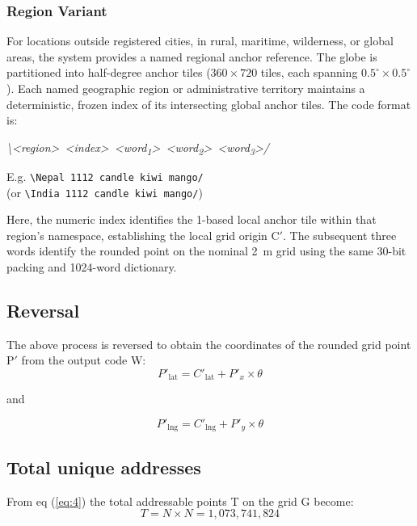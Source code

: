 \documentclass[conference]{IEEEtran}
\begin{document}
\subsubsection{Region Variant}
For locations outside registered cities, in rural, maritime, wilderness, or global areas, the system provides a named regional anchor reference. The globe is partitioned into half-degree anchor tiles ($360 \times 720$ tiles, each spanning $0.5^\circ \times 0.5^\circ$). Each named geographic region or administrative territory maintains a deterministic, frozen index of its intersecting global anchor tiles.
The code format is:
\begin{center}
\textit{\textbackslash{}\hspace{0.55em}\textless region\textgreater\ \textless index\textgreater\ \textless word\textsubscript{1}\textgreater\ \textless word\textsubscript{2}\textgreater\ \textless word\textsubscript{3}\textgreater\hspace{0.55em}/}
\end{center}
E.g. \texttt{\textbackslash{}\hspace{0.55em}Nepal 1112 candle kiwi mango\hspace{0.55em}/}\\
(or \texttt{\textbackslash{}\hspace{0.55em}India 1112 candle kiwi mango\hspace{0.55em}/})

Here, the numeric index identifies the 1-based local anchor tile within that region's namespace, establishing the local grid origin C$'$. The subsequent three words identify the rounded point on the nominal 2~m grid using the same 30-bit packing and 1024-word dictionary.

\subsection{Reversal}\label{AA}
The above process is reversed to obtain the coordinates of the rounded grid point P$'$ from the output code W:
\begin{equation}
P'_{\mathrm{lat}} = C'_{\mathrm{lat}} + P'_x \times \theta
\end{equation}

and

\begin{equation}
P'_{\mathrm{lng}} = C'_{\mathrm{lng}} + P'_y \times \theta
\end{equation}

\subsection{Total unique addresses}
From eq (\ref{eq:4}) the total addressable points T on the grid G become:
\begin{equation}
T = N \times N = 1{,}073{,}741{,}824
\end{equation}
\end{document}
